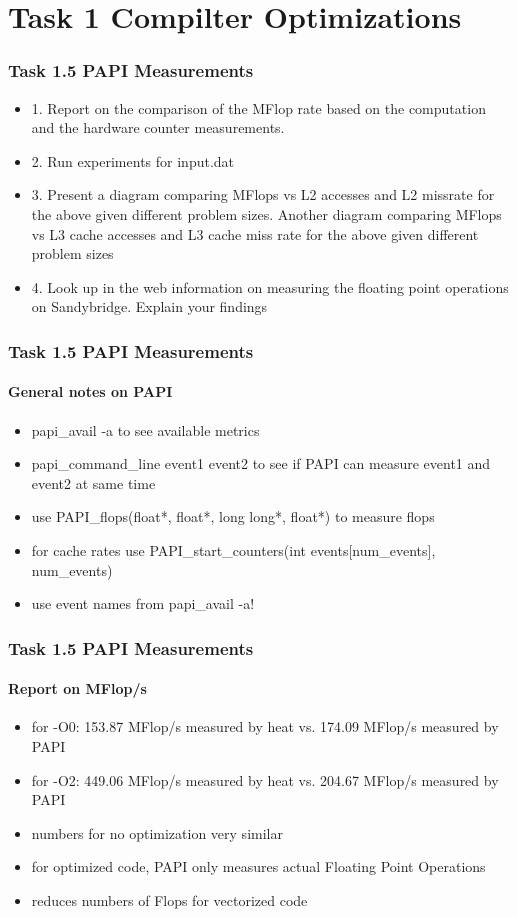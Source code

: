 \section{Task 1 Compilter Optimizations}
\begin{frame}
\frametitle{Task 1.5 PAPI Measurements}
\begin{itemize}
\item 1. Report on the comparison of the MFlop rate based on the computation and the hardware counter measurements.
\item 2. Run experiments for input.dat
\item 3. Present a diagram comparing MFlops vs L2 accesses and L2 missrate for the above given different problem sizes. Another diagram comparing MFlops vs L3 cache accesses and L3 cache miss rate for the above given different problem sizes
\item 4. Look up in the web information on measuring the floating point operations on Sandybridge. Explain your findings
\end{itemize}
\end{frame}

\begin{frame}
\frametitle{Task 1.5 PAPI Measurements}
\framesubtitle{General notes on PAPI}
\begin{itemize}
\item papi\_avail -a to see available metrics
\item papi\_command\_line event1 event2 to see if PAPI can measure event1 and event2 at same time
\item use PAPI\_flops(float*, float*, long long*, float*) to measure flops
\item for cache rates use PAPI\_start\_counters(int events[num\_events], num\_events)
\item use event names from papi\_avail -a!
\end{itemize}
\end{frame}

\begin{frame}
\frametitle{Task 1.5 PAPI Measurements}
\framesubtitle{Report on MFlop/s}
\begin{itemize}
\item for -O0: 153.87 MFlop/s measured by heat vs. 174.09 MFlop/s measured by PAPI
\item for -O2: 449.06 MFlop/s measured by heat vs. 204.67 MFlop/s measured by PAPI
\item numbers for no optimization very similar
\item for optimized code, PAPI only measures actual Floating Point Operations
\item reduces numbers of Flops for vectorized code
\end{itemize}
\end{frame}


